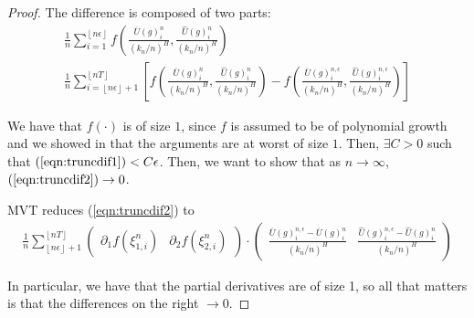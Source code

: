 \documentclass[12pt,letterpaper]{article}
\theoremstyle{definition}
\begin{document}
\begin{proof}
  The difference is composed of two parts:
  \begin{gather}
    \label{eqn:truncdif1}
    \frac{1}{n}\sum_{i=1}^{\left\lfloor n\epsilon \right\rfloor} f\left( \frac{\overline{U}(g)^n_i}{(k_n/n)^H}, \frac{\widehat{U}(g)^n_i}{(k_n/n)^H} \right) \\
    \label{eqn:truncdif2}
    \frac{1}{n}\sum_{i=\left\lfloor n\epsilon \right\rfloor + 1}^{\left\lfloor nT \right\rfloor}\left[ f\left( \frac{\overline{U}(g)^{n}_i}{(k_n/n)^H}, \frac{\widehat{U}(g)^{n}_i}{(k_n/n)^H} \right) -  f\left( \frac{\overline{U}(g)^{n,\epsilon}_i}{(k_n/n)^H}, \frac{\widehat{U}(g)^{n,\epsilon}_i}{(k_n/n)^H} \right) \right]
  \end{gather}

  We have that \(f(\cdot)\) is of size \(1\), since \(f\) is assumed to be of polynomial growth and we showed in  that the arguments are at worst of size \(1\). Then, \(\exists C > 0\) such that \((\ref{eqn:truncdif1}) < C\epsilon\). Then, we want to show that as \(n \rightarrow \infty\), \((\ref{eqn:truncdif2}) \rightarrow 0\). %

  MVT reduces (\ref{eqn:truncdif2}) to
  \begin{gather}
    \frac{1}{n}\sum_{\left\lfloor n\epsilon \right\rfloor + 1}^{\left\lfloor nT \right\rfloor} \begin{pmatrix} \partial_1 f(\xi_{1,i}^n) & \partial_2 f(\xi_{2,i}^n) \end{pmatrix} \cdot \begin{pmatrix} \frac{\overline{U}(g)^{n,\epsilon}_i - \overline{U}(g)^{n}_i}{(k_n/n)^H} & \frac{\widehat{U}(g)^{n,\epsilon}_i - \widehat{U}(g)^{n}_i}{(k_n/n)^H} \end{pmatrix}
  \end{gather}

  In particular, we have that the partial derivatives are of size 1, so all that matters is that the differences on the right \(\rightarrow 0\).


\end{proof}
\end{document}
